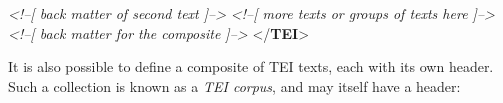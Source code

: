 \documentclass[11pt,twoside]{article}\makeatletter
\begin{document}
\begin{shaded}
\hspace*{1em}\hspace*{1em}\hspace*{1em}\mbox{}\newline 
\textit{<!--[ back matter of second text ]-->}\mbox{}\newline 
\hspace*{1em}\hspace*{1em}\hspace*{1em}\mbox{}\newline 
\hspace*{1em}\hspace*{1em}\mbox{}\newline 
\textit{<!--[ more texts or groups of texts here ]-->}\mbox{}\newline 
\hspace*{1em}\mbox{}\newline 
\hspace*{1em}\mbox{}\newline 
\textit{<!--[ back matter for the composite  ]-->}\mbox{}\newline 
\hspace*{1em}\mbox{}\newline 
{}\mbox{}\newline 
{</\textbf{TEI}>}\end{shaded}\egroup\par \par It is also possible to define a composite of TEI texts, each with
its own header. Such a collection is known as a \emph{TEI corpus},
and may itself have a header:
\end{document}
